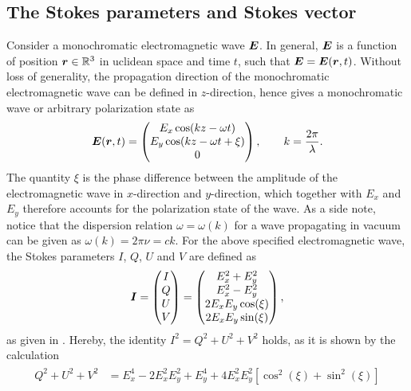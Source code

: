 \documentclass[a4paper,12pt]{report}
\def\lk#1{{\color{black}{#1}}}
\begin{document}
\subsection{The Stokes parameters and Stokes vector}
Consider a monochromatic electromagnetic wave $\bm{E}$. In general, $\bm{E}$ is a function of position $\bm{r} \in \mathbb{R}^3$ in \lk{E}uclidean space and time $t$, such that $\bm{E} = \bm{E}(\bm{r},t)$. Without loss of generality, the propagation direction of the monochromatic electromagnetic wave can be defined in $z$-direction, hence \cite[p.121]{Stix.2002} gives a monochromatic wave or arbitrary polarization state as \begin{equation}\label{eq:E-wave}
\bm{E}(\bm{r},t) = \begin{pmatrix}
E_x \cos(k z - \omega t) \\ E_y \cos(kz-\omega t + \xi) \\ 0
\end{pmatrix}, \qquad k = \frac{2\pi}{\lambda}.
\end{equation} The quantity $\xi$ is the phase difference between the amplitude of the electromagnetic wave in $x$-direction and $y$-direction, which together with $E_x$ and $E_y$ therefore accounts for the polarization state of the wave. As a side note, notice that the dispersion relation $\omega = \omega(k)$ for a wave propagating in vacuum can be given as $\omega(k) = 2\pi\nu = ck$. For the above specified electromagnetic wave, the Stokes parameters $I$, $Q$, $U$ and $V$ are defined as \begin{equation}
\bm{I} = \begin{pmatrix}
I \\ Q \\ U \\ V
\end{pmatrix} = \begin{pmatrix}
E_x^2 + E_y^2 \\ E_x^2 - E_y^2 \\ 2E_xE_y\cos(\xi) \\ 2E_xE_y\sin(\xi)
\end{pmatrix},
\end{equation} as given in \cite[p.121]{Stix.2002}. Hereby, the identity $I^2 = Q^2 + U^2 + V^2$ holds, as it is shown by the calculation \begin{align}
\begin{aligned}
Q^2 + U^2 + V^2 &= E_x^4 - 2E_x^2E_y^2 + E_y^4 + 4E_x^2E_y^2\left[\cos^2(\xi) + \sin^2(\xi)\right] \\

\end{aligned}
\end{align}
\end{document}
